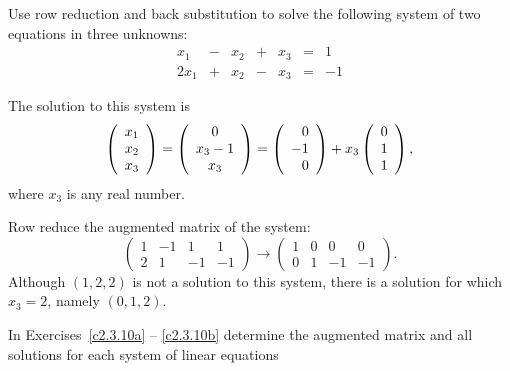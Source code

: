 \documentclass{ximera}
\begin{document}


\problemlabel

\begin{exercise} \label{c2.3.9}
Use row reduction and back substitution to solve the following
system of two equations in three unknowns:
\[
\begin{array}{rcrcrcrc}
 x_1 & - & x_2 & + & x_3 & = & 1 \\
2x_1 & + & x_2 & - & x_3 & = & -1
\end{array}
\]

\begin{solution}

\ans The solution to this system is
\[
\left(\begin{array}{c} x_1 \\ x_2 \\ x_3\end{array}\right) =
\left(\begin{array}{c} 0 \\ x_3 - 1 \\ x_3\end{array}\right) = \left(\begin{array}{rrrrrrrrrrrrrrrrrr} 0 \\ -1 \\ 0 \end{array}\right) + x_3\left(\begin{array}{rrrrrrrrrrrrrrrrrr} 0 \\ 1 \\ 1 \end{array}\right),
\]
where $x_3$ is any real number.

\soln Row reduce the augmented matrix of the system:
\[
\left(\begin{array}{rrr|r} 1 & -1 & 1 & 1 \\ 2 & 1 & -1 & -1\end{array}\right)
\longrightarrow
\left(\begin{array}{rrr|r} 1 & 0 & 0 & 0 \\ 0 & 1 & -1 & -1\end{array}\right).
\]
Although $(1,2,2)$ is not a solution to this system, there is a solution
for which $x_3 = 2$, namely $(0,1,2)$.

\end{solution}
\end{exercise}




\problemlabel

\noindent In Exercises~\ref{c2.3.10a} -- \ref{c2.3.10b} determine the
augmented matrix and all solutions for each system of linear equations
\end{document}
